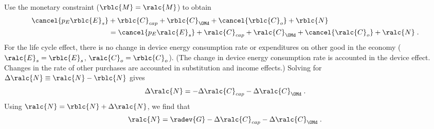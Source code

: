 \begin{landscape}
{Use the monetary constraint ($\rblc{M} = \ralc{M}$) to obtain
%
\begin{align} \label{M_dot_bal_lc}
  \cancel{p_E \rblc{E}_s} &+ \rblc{C}_{cap} + \rblc{C}_{\OMd} + \cancel{\rblc{C}_o} + \rblc{N} \nonumber \\
                          &= \cancel{p_E \ralc{E}_s} + \ralc{C}_{cap} + \ralc{C}_{\OMd} + \cancel{\ralc{C}_o}  + \ralc{N} \; .
\end{align}
%
For the life cycle effect, 
there is no change in device energy consumption rate or expenditures on other good in the economy 
($\ralc{E}_s = \rblc{E}_s$, $\ralc{C}_o = \rblc{C}_o$).
(The change in device energy consumption rate is accounted in the device effect.
Changes in the rate of other purchases are accounted in substitution and income effects.)
Solving for $\Delta \ralc{N} \equiv \ralc{N} - \rblc{N}$ gives
%
\begin{equation}
  \Delta \ralc{N} = - \Delta \ralc{C}_{cap} - \Delta \ralc{C}_{\OMd} \; .
\end{equation}
%
Using $\ralc{N} = \rblc{N} + \Delta \ralc{N}$, we find that
%
\begin{equation}
  \ralc{N} = \radev{G} - \Delta \ralc{C}_{cap} - \Delta \ralc{C}_{\OMd} \; .
\end{equation}
%
}

\end{landscape}
